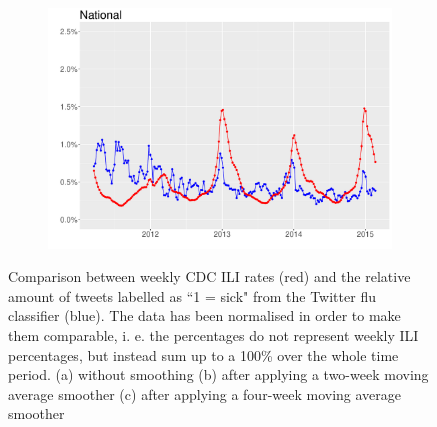 \documentclass[11pt, a4paper,twoside]{report}\usepackage[]{graphicx}\usepackage[]{color}
\begin{document}
\begin{figure}[H]
  \begin{subfigure}[t]{0.6\textwidth}
  \includegraphics[width=1\linewidth,height=0.5\linewidth]{cdc_twitter_comp_nat_ma4.pdf}
  \caption{}
  \label{fig:cdc_tw_comp_nat_ma4}
  \end{subfigure}
  \caption{Comparison between weekly CDC ILI rates (red) and the relative amount of tweets labelled as ``1 = sick" from the Twitter flu classifier (blue). The data has been normalised in order to make them comparable, i. e. the percentages do not represent weekly ILI percentages, but instead sum up to a 100\% over the whole time period. (a) without smoothing (b) after applying a two-week moving average smoother (c) after applying a four-week moving average smoother}
\end{figure}
\end{document}
